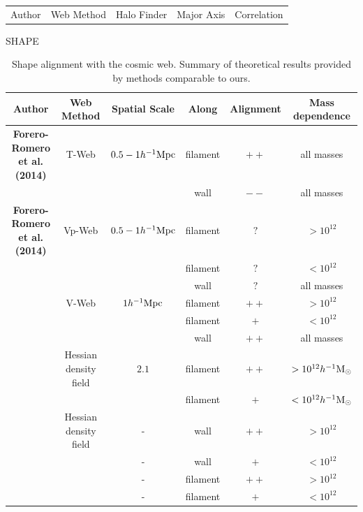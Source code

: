 \documentclass[usenatbib]{mn2e}
\newcommand{\hMpc}{{\ifmmode{h^{-1}{\rm Mpc}}\else{$h^{-1}$Mpc }\fi}}
\newcommand{\hMsun}{{\ifmmode{h^{-1}{\rm
        {M_{\odot}}}}\else{$h^{-1}{\rm{M_{\odot}}}$}\fi}}
\begin{document}
\begin{table}
\begin{tabular}{lllll}
Author & Web Method & Halo Finder & Major Axis & Correlation\\
\end{tabular}
SHAPE
\end{table}

\begin{table}
\begin{tabular}{cccccc}\hline\hline
Author & Web Method & Spatial Scale & Along &
Alignment & Mass dependence\\\hline

{\bf Forero-Romero et al. (2014)} & T-Web & $0.5-1 \hMpc$ & 
filament &$++$ & all masses\hMsun\\
&   & & 
wall & $--$ & all masses\\\hline

{\bf Forero-Romero et al. (2014)} & Vp-Web & $0.5-1 \hMpc$ & 
filament &$?$ & $>10^{12}$\hMsun\\
&   & & 
filament &$?$ & $<10^{12}$\hMsun\\
&   & & 
wall & $?$ & all masses\\\hline

\cite{Libeskind2013} & V-Web & $1 \hMpc$ & 
filament &$++$ & $>10^{12}$\hMsun\\
&   & & 
filament &$+$ & $<10^{12}$\hMsun\\
&   & & 
wall & $++$ & all masses\\\hline

\cite{Zhang2009}  & Hessian density field &  $2.1$\hMpc & 
filament & $++$ & $>10^{12}\hMsun$\\

& &  & 
filament & $+$ & $<10^{12}\hMsun$\\\hline

\cite{AragonCalvo2007} & Hessian density field & - &
wall & $++$ & $>10^{12}$\hMsun\\

& & - &
wall & $+$ & $<10^{12}$\hMsun\\

& & - &
filament& $++$ & $>10^{12}$\hMsun\\

& & - &
filament& $+$ & $<10^{12}$\hMsun\\\hline \hline

\end{tabular}\\
\caption{Shape alignment with the cosmic web. Summary of theoretical
  results provided by methods comparable to ours.}
\end{table}
\end{document}

